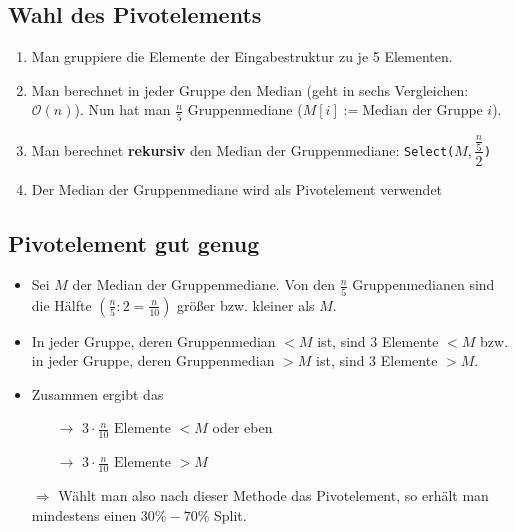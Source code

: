 \documentclass{scrartcl}%
\begin{document}
    \subsection*{Wahl des Pivotelements}
    \begin{enumerate}
        \item Man gruppiere die Elemente der Eingabestruktur zu je 5 Elementen.
        \item Man berechnet in jeder Gruppe den Median (geht in sechs Vergleichen: $\mathcal{O}(n)$).
        Nun hat man $\frac{n}{5}$ Gruppenmediane ($M[i] := \text{Median der Gruppe }i$).
        \item Man berechnet \textbf{rekursiv} den Median der Gruppenmediane: \texttt{Select($M, \dfrac{\frac{n}{5}}{2}$)}
        \item Der Median der Gruppenmediane wird als Pivotelement verwendet
    \end{enumerate}

    \subsection*{Pivotelement gut genug}
    \begin{itemize}
        \item Sei $M$ der Median der Gruppenmediane.
        Von den $\frac{n}{5}$ Gruppenmedianen sind die Hälfte $(\frac{n}{5}:2=\frac{n}{10})$ größer bzw. kleiner als $M$.
        \item In jeder Gruppe, deren Gruppenmedian $<M$ ist, sind 3 Elemente $<M$ bzw. in jeder Gruppe, deren Gruppenmedian $>M$ ist, sind 3 Elemente $>M$.
        \item Zusammen ergibt das
        \begin{itemize}
            \item [$\rightarrow$] $3 \cdot \frac{n}{10} \text{ Elemente }<M$ oder eben
            \item [$\rightarrow$] $3 \cdot \frac{n}{10} \text{ Elemente }>M$
        \end{itemize}
        \item [$\Rightarrow$] Wählt man also nach dieser Methode das Pivotelement, so erhält man mindestens einen $30\%-70\%$ Split.
    \end{itemize}
\end{document}
